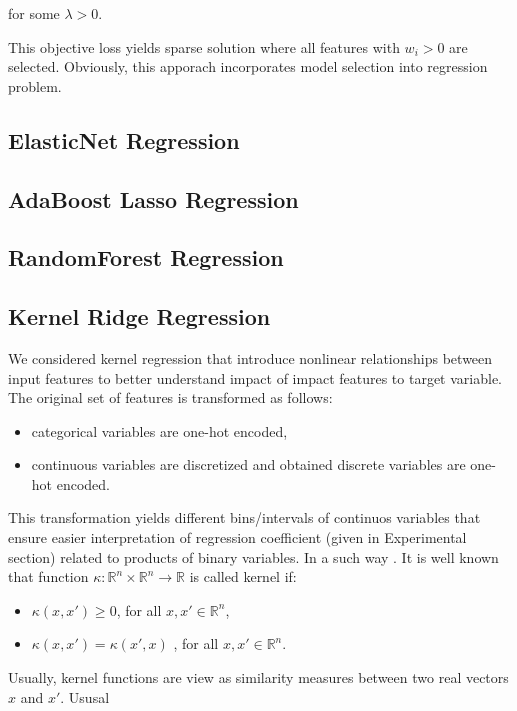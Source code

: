 \documentclass{article}
\begin{document}
for some $\lambda>0$.


This objective loss yields sparse solution where all features with $w_i>0$ are selected. Obviously, this apporach incorporates model selection into regression problem.

\subsection{ElasticNet Regression}

\subsection{AdaBoost Lasso Regression}

\subsection{RandomForest Regression}

\subsection{Kernel Ridge Regression}

 We considered kernel regression that introduce nonlinear relationships between input features to better understand impact of impact features to target variable. The original set of features is transformed as follows:\begin{itemize}
  \item categorical variables are one-hot encoded,
  \item continuous variables are discretized and obtained discrete variables are one-hot encoded.
\end{itemize}
This transformation yields different bins/intervals of continuos variables that ensure easier interpretation of regression coefficient (given in Experimental section) related to products of binary variables. In a such way 
. It is well known that function $\kappa:\mathbb{R}^{n}\times\mathbb{R}^n\rightarrow\mathbb{R}$ is called kernel if:
\begin{itemize}
  \item $\kappa(x,x')\geq 0$, for all $x,x'\in \mathbb{R}^n$,
  \item $\kappa(x,x') = \kappa(x',x)$ , for all $x,x'\in \mathbb{R}^n$.
\end{itemize}

Usually, kernel functions are view as similarity measures between two real vectors $x$ and $x'$. Ususal 
\end{document}
